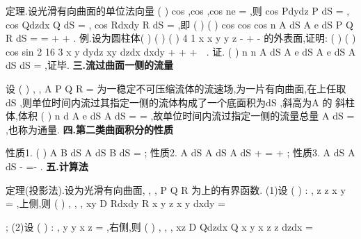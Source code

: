 \textcolor{lyred}{定理}.设光滑有向曲面\Sigma 的单位法向量
(
)
cos ,cos
,cos
ne
\alpha 
\beta 
\gamma 
=
\rho 
,则 
cos
Pdydz
P
dS
\alpha 
\Sigma 
\Sigma 
=
\cdots 
\int \int 
\int \int 
,
cos
Qdzdx
Q
dS
\beta 
\Sigma 
\Sigma 
=
\cdots 
\int \int 
\int \int 
,
cos
Rdxdy
R
dS
\gamma 
\Sigma 
\Sigma 
=
\int \int 
\int \int 
,即 
(
)
(
)
cos
cos
cos
n
A dS
A e
dS
P
Q
R
dS
\alpha 
\beta 
\gamma 
\Sigma 
\Sigma 
\Sigma 
\cdots 
=
\cdots 
=
+
+
\int \int 
\int \int 
\int \int 
\rho 
\rho 
\rho \rho 
. 
\textcolor{lyred}{例}.设\Sigma 为圆柱体(
)
(
)
(
)
4 1
x
x
y
y
z
-
+
-
\le 
\le 
\le 
的外表面,证明: 
(
)
(
)
cos
sin 2
16 3
x
y dydz
xy
dzdx
dxdy
\pi 
\Sigma 
+
+
+
\le 
\int \int 
. 
证.
(
)
n
n
A dS
A e
dS
A e dS
A dS
dS
\Sigma 
\Sigma 
\Sigma 
\Sigma 
\Sigma 
\cdots 
=
\cdots 
\le 
\cdots 
\le 
\le 
\int \int 
\int \int 
\int \int 
\int \int 
\int \int 
\rho 
\rho 
\rho 
\rho 
\rho 
\rho 
\rho 
,证毕. 
\vspace{4pt}
{\bfseries \textcolor{lyred}{三.流过曲面一侧的流量}}

设
(
)
,
,
A
P Q R
=
\rho 
为一稳定不可压缩流体的流速场,\Sigma 为一片有向曲面,在\Sigma 上任取 
dS ,则单位时间内流过其指定一侧的流体构成了一个底面积为dS ,斜高为A
\rho 
的 
斜柱体,体积
(
)
n
d
A e
dS
A dS
\Phi =
\cdots 
=
\cdots 
\rho 
\rho 
\rho 
\rho 
,故单位时间内流过\Sigma 指定一侧的流量总量 
A dS
\Sigma 
\Phi =
\cdots 
\int \int 
\rho 
\rho 
,也称为\textcolor{lyred}{通量}. 
\vspace{4pt}
{\bfseries \textcolor{lyred}{四.第二类曲面积分的性质}}

\textcolor{lyred}{性质1}.
(
)
A
B
dS
A dS
B dS
\alpha 
\beta 
\alpha 
\beta 
\Sigma 
\Sigma 
\Sigma 
\pm 
\cdots 
=
\cdots 
\pm 
\cdots 
\int \int 
\int \int 
\int \int 
\rho 
\rho 
\rho 
\rho 
\rho 
\rho 
; 
\textcolor{lyred}{性质2}.
A dS
A dS
A dS
\Sigma +\Sigma 
\Sigma 
\Sigma 
\cdots 
=
\cdots 
+
\cdots 
\int \int 
\int \int 
\int \int 
\rho 
\rho 
\rho 
\rho 
\rho 
\rho 
; 
\textcolor{lyred}{性质3}.
A dS
A dS
-\Sigma 
\Sigma 
\cdots 
=-
\cdots 
\int \int 
\int \int 
\rho 
\rho 
\rho 
\rho 
. 
\vspace{4pt}
{\bfseries \textcolor{lyred}{五.计算法}}

\textcolor{lyred}{定理(投影法)}.设\Sigma 为光滑有向曲面,
,
,
P Q R 为\Sigma 上的有界函数. 
(1)设
(
)
:
,
z
z x y
\Sigma 
=
,上侧,则
(
)
, ,
,
xy
D
Rdxdy
R x y z x y
dxdy
\Sigma 
=




\int \int 
\int \int 
; 
(2)设
(
)
:
,
y
y x z
\Sigma 
=
,右侧,则
(
)
,
,
,
xz
D
Qdzdx
Q x y x z
z dzdx
\Sigma 
=





